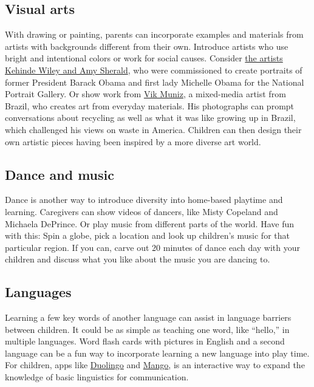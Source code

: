 \hypertarget{visual-arts}{%
\subsection{Visual arts}\label{visual-arts}}

With drawing or painting, parents can incorporate examples and materials
from artists with backgrounds different from their own. Introduce
artists who use bright and intentional colors or work for social causes.
Consider
\href{https://www.nytimes.com/2018/02/12/arts/obama-portraitists-bonded-the-everyday-and-the-extraordinary.html}{the
artists Kehinde Wiley and Amy Sherald}, who were commissioned to create
portraits of former President Barack Obama and first lady Michelle Obama
for the National Portrait Gallery. Or show work from
\href{https://www.nytimes.com/2010/10/24/arts/design/24muniz.html}{Vik
Muniz}, a mixed-media artist from Brazil, who creates art from everyday
materials. His photographs can prompt conversations about recycling as
well as what it was like growing up in Brazil, which challenged his
views on waste in America. Children can then design their own artistic
pieces having been inspired by a more diverse art world.

\hypertarget{dance-and-music}{%
\subsection{Dance and music}\label{dance-and-music}}

Dance is another way to introduce diversity into home-based playtime and
learning. Caregivers can show videos of dancers, like Misty Copeland and
Michaela DePrince. Or play music from different parts of the world. Have
fun with this: Spin a globe, pick a location and look up children's
music for that particular region. If you can, carve out 20 minutes of
dance each day with your children and discuss what you like about the
music you are dancing to.

\hypertarget{languages}{%
\subsection{Languages}\label{languages}}

Learning a few key words of another language can assist in language
barriers between children. It could be as simple as teaching one word,
like ``hello,'' in multiple languages. Word flash cards with pictures in
English and a second language can be a fun way to incorporate learning a
new language into play time. For children, apps like
\href{https://www.duolingo.com/}{Duolingo} and
\href{https://mangolanguages.com/}{Mango}, is an interactive way to
expand the knowledge of basic linguistics for communication.

